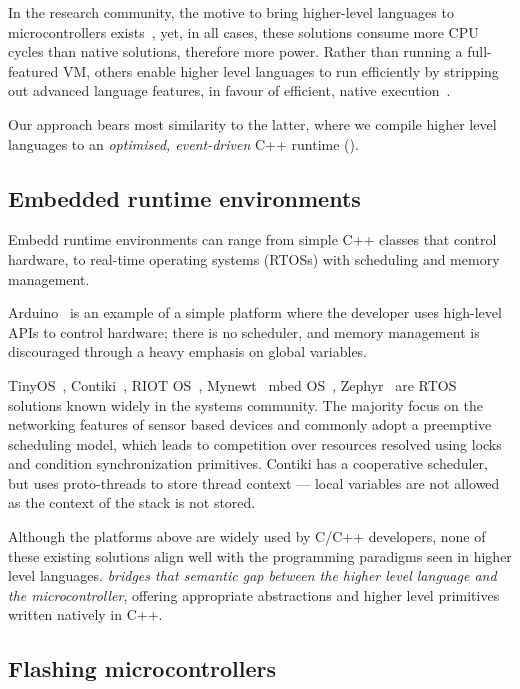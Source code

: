 In the research community, the motive to bring higher-level languages to microcontrollers exists~\cite{koshy2005vmstar,st2009picobit,vaugon2015programming}, yet, in all cases, these solutions consume more CPU cycles than native solutions, therefore more power. Rather than running a full-featured VM, others enable higher level languages to run efficiently by stripping out advanced language features, in favour of efficient, native execution~\cite{varma2004java}.

Our approach bears most similarity to the latter, where we compile higher level languages to an \emph{optimised, event-driven} C++ runtime (\CON).

\subsection{Embedded runtime environments}

Embedd runtime environments can range from simple C++ classes that control hardware, to real-time operating systems (RTOSs) with scheduling and memory management.

Arduino~\cite{buildingArduino2014} is an example of a simple platform where the developer uses high-level APIs to control hardware; there is no scheduler, and memory management is discouraged through a heavy emphasis on global variables.

TinyOS~\cite{levis2005tinyos}, Contiki~\cite{dunkels2012contiki}, RIOT OS~\cite{baccelli2013riot}, Mynewt~\cite{ApacheMy53:online} mbed OS~\cite{ARMmbed}, Zephyr~\cite{HomeZeph63:online} are RTOS solutions known widely in the systems community. The majority focus on the networking features of sensor based devices and commonly adopt a preemptive scheduling model, which leads to competition over resources resolved using locks and condition synchronization primitives. Contiki has a cooperative scheduler, but uses proto-threads to store thread context --- local variables are not allowed as the context of the stack is not stored.

Although the platforms above are widely used by C/C++ developers, none of these existing solutions align well with the programming paradigms seen in higher level languages. \CO \emph{bridges that semantic gap between the higher level language and the microcontroller}, offering appropriate abstractions and higher level primitives written natively in C++.

\subsection{Flashing microcontrollers}

